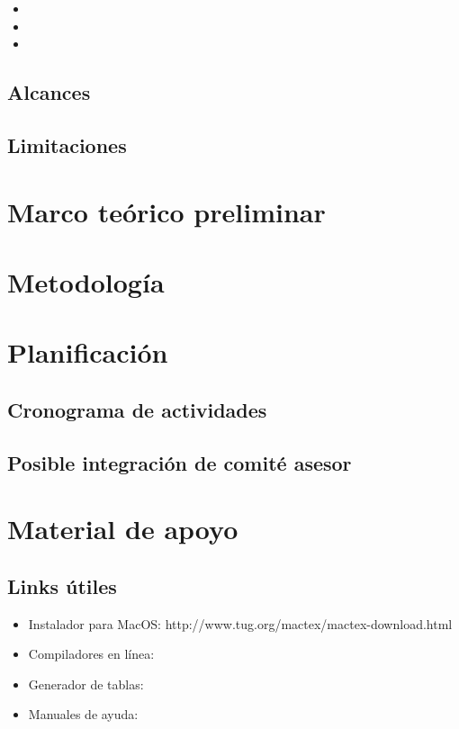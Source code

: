 \documentclass[12pt]{report}
\begin{document}
\begin{itemize}

\item 
\item 
\item 

\end{itemize}

\section{Alcances}

\section{Limitaciones}

\chapter{Marco teórico preliminar}

\chapter{Metodología}

\chapter{Planificación}
\section{Cronograma de actividades}

\section{Posible integración de comité asesor}


\newpage
\chapter{Material de apoyo}
\section{Links útiles}
\begin{itemize}
\item Instalador para MacOS:
http://www.tug.org/mactex/mactex-download.html
\item Compiladores en línea:
\item Generador de tablas:
\item Manuales de ayuda:
\end{itemize}


\newpage



\end{document}
